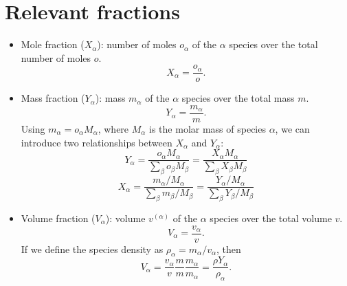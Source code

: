 \documentclass[oneside,a4paper,11pt]{report}
\begin{document}
\section{Relevant fractions}
\begin{itemize}
    \item Mole fraction ($X_\alpha$): number of moles $o_\alpha$ of the $\alpha$ species over the total number of moles $o$.
    \begin{equation}
        X_\alpha = \frac{o_\alpha}{o}.
    \end{equation}
    \item Mass fraction ($Y_\alpha$): mass $m_\alpha$ of the $\alpha$ species over the total mass $m$. 
    \begin{equation}
        Y_\alpha = \frac{m_\alpha}{m}.
    \end{equation}
    Using $m_\alpha = o_\alpha M_\alpha$, where $M_\alpha$ is the molar mass of species $\alpha$, we can introduce two relationships between $X_\alpha$ and $Y_\alpha$:
    \begin{equation}
    \label{eq:y_intermsof_x}
        Y_\alpha = \frac{o_\alpha M_\alpha}{\sum_\beta o_\beta M_\beta} = \frac{X_\alpha M_\alpha}{\sum_\beta X_\beta M_\beta}
    \end{equation}
    \begin{equation}
    \label{eq:x_intermsof_y}
        X_\alpha = \frac{m_\alpha / M_\alpha}{\sum_\beta m_\beta / M_\beta} = \frac{Y_\alpha / M_\alpha}{ \sum_\beta Y_\beta / M_\beta}
    \end{equation}
    \item Volume fraction ($V_\alpha$): volume $v^{(\alpha)}$ of the $\alpha$ species over the total volume $v$.
    \begin{equation}
        V_\alpha = \frac{v_\alpha}{v}.
    \end{equation}
    If we define the species density as $\rho_\alpha = m_\alpha/v_\alpha$, then
    \begin{equation}
    \label{eq:relation_volume_density_mass}
        V_\alpha = \frac{v_\alpha}{v} \frac{m}{m} \frac{m_\alpha}{m_\alpha} = \frac{\rho Y_\alpha}{\rho_\alpha}.
    \end{equation}
\end{itemize}
\end{document}
